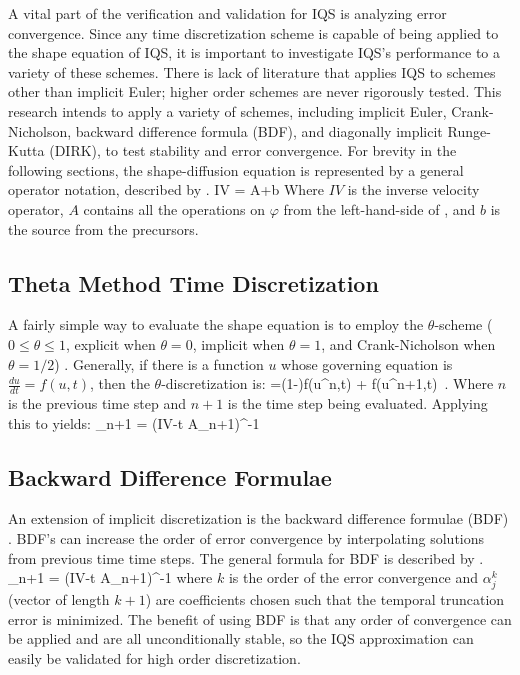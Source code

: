 A vital part of the verification and validation for IQS is analyzing error convergence.  Since any time discretization scheme is capable of being applied to the shape equation of IQS, it is important to investigate IQS's performance to a variety of these schemes.  There is lack of literature that applies IQS to schemes other than implicit Euler; higher order schemes are never rigorously tested.  This research intends to apply a variety of schemes, including implicit Euler, Crank-Nicholson, backward difference formula (BDF), and diagonally implicit Runge-Kutta (DIRK), to test stability and error convergence.  For brevity in the following sections, the shape-diffusion equation is represented by a general operator notation, described by .
\be 
IV = A\varphi+b
\label{eq:shape_mat}
\ee
Where $IV$ is the inverse velocity operator, $A$ contains all the operations on $\varphi$ from the left-hand-side of , and $b$ is the source from the precursors. 

\subsection{Theta Method Time Discretization}
\label{sect:theta}

A fairly simple way to evaluate the shape equation is to employ the $\theta$-scheme ($0\le\theta\le1$, explicit when $\theta=0$, implicit when $\theta=1$, and Crank-Nicholson when $\theta=1/2$) \cite{Ferziger}.  Generally, if there is a function $u$ whose governing equation is $\frac{du}{dt}=f(u,t)$, then the $\theta$-discretization is:
\be
{}=(1-\theta)f(u^n,t) + \theta f(u^{n+1},t) \,.
\ee
Where $n$ is the previous time step and $n+1$ is the time step being evaluated. Applying this to  yields:
\be
\varphi_{n+1} = (IV-\Delta t A_{n+1})^{-1}
\ee

\subsection{Backward Difference Formulae}

An extension of implicit discretization is the backward difference formulae (BDF) \cite{Gear:2007}.  BDF's can increase the order of error convergence by interpolating solutions from previous time time steps. The general formula for BDF is described by .
\be 
\varphi_{n+1} = (IV-\Delta t A_{n+1})^{-1}\left[IV\sum_{j=0}^{k-1}\alpha_{j}^{k}\varphi_{n-j} +
\Delta t \alpha_{k+1}^{k} b_{n+1}\right]
\label{eq:bdf}
\ee
where $k$ is the order of the error convergence and $\alpha_{j}^{k}$ (vector of length $k+1$) are coefficients chosen such that the temporal truncation error is minimized.  The benefit of using BDF is that any order of convergence can be applied and are all unconditionally stable, so the IQS approximation can easily be validated for high order discretization.
